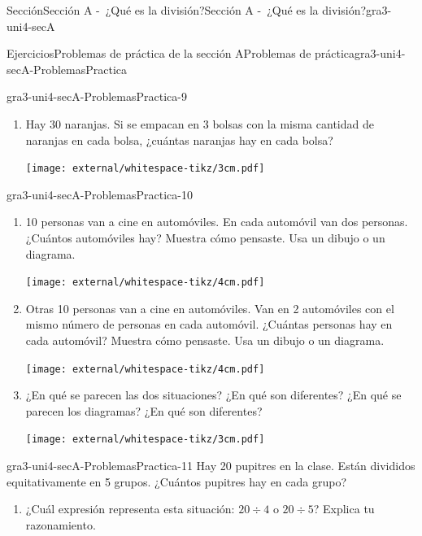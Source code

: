 \begin{sectionptx}{Sección}{Sección A -~¿Qué es la división?}{}{Sección A -~¿Qué es la división?}{}{}{gra3-uni4-secA}
\begin{exercises-subsection}{Ejercicios}{Problemas de práctica de la sección A}{}{Problemas de práctica}{}{}{gra3-uni4-secA-ProblemasPractica}
\begin{divisionexercise}{7}{}{}{gra3-uni4-secA-ProblemasPractica-9}
\begin{enumerate}[label={(\alph*)}]
\begin{image}{0}{1}{0}{}%
\texttt{[image: external/whitespace-tikz/3cm.pdf]}
\end{image}%
\item{}Hay 30 naranjas. Si se empacan en 3 bolsas con la misma cantidad de naranjas en cada bolsa, ¿cuántas naranjas hay en cada bolsa?%
\begin{image}{0}{1}{0}{}%
\texttt{[image: external/whitespace-tikz/3cm.pdf]}
\end{image}%
\end{enumerate}
\end{divisionexercise}%
\begin{divisionexercise}{8}{}{}{gra3-uni4-secA-ProblemasPractica-10}%
%
\vspace{-3ex}
\begin{enumerate}[label={(\alph*)}]
\item{}10 personas van a cine en automóviles. En cada automóvil van dos personas. ¿Cuántos automóviles hay? Muestra cómo pensaste. Usa un dibujo o un diagrama.%
\begin{image}{0}{1}{0}{}%
\texttt{[image: external/whitespace-tikz/4cm.pdf]}
\end{image}%
\item{}Otras 10 personas van a cine en automóviles. Van en 2 automóviles con el mismo número de personas en cada automóvil. ¿Cuántas personas hay en cada automóvil? Muestra cómo pensaste. Usa un dibujo o un diagrama.%
\begin{image}{0}{1}{0}{}%
\texttt{[image: external/whitespace-tikz/4cm.pdf]}
\end{image}%
\item{}¿En qué se parecen las dos situaciones? ¿En qué son diferentes? ¿En qué se parecen los diagramas? ¿En qué son diferentes?%
\begin{image}{0}{1}{0}{}%
\texttt{[image: external/whitespace-tikz/3cm.pdf]}
\end{image}%
\end{enumerate}
%
\end{divisionexercise}%
\clearpage
\begin{divisionexercise}{9}{}{}{gra3-uni4-secA-ProblemasPractica-11}%
Hay 20 pupitres en la clase. Están divididos equitativamente en 5 grupos. ¿Cuántos pupitres hay en cada grupo?%
\par
%
\begin{enumerate}[label={(\alph*)}]
\item{}¿Cuál expresión representa esta situación: \(20\div 4\) o \(20\div 5\)? Explica tu razonamiento.%

\end{enumerate}
\end{divisionexercise}
\end{exercises-subsection}
\end{sectionptx}
